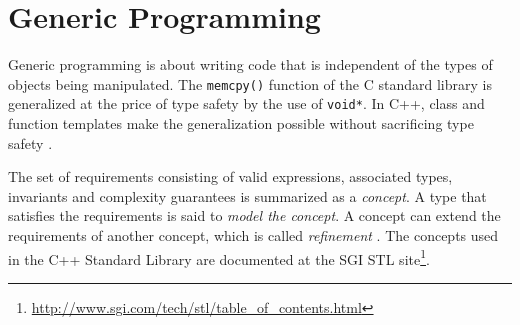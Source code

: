 \section{Generic Programming}

Generic programming is about writing code that is independent of the types of
objects being manipulated. The \texttt{memcpy()} function of the C standard
library is generalized at the price of type safety by the use of \texttt{void*}.
In C++, class and function templates make the generalization possible without
sacrificing type safety
\cite{Alexandrescu:2001:MCD:377789,Meyers:2005:ECS:1051335}.

The set of requirements consisting of valid expressions, associated types,
invariants and complexity guarantees is summarized as a \emph{concept}. A type
that satisfies the requirements is said to \emph{model the concept}. A concept
can extend the requirements of another concept, which is called
\emph{refinement} \cite{gregor08:devx_concepts}. The concepts used in the C++
Standard Library are documented at the SGI STL
site\footnote{\url{http://www.sgi.com/tech/stl/table_of_contents.html}}.

